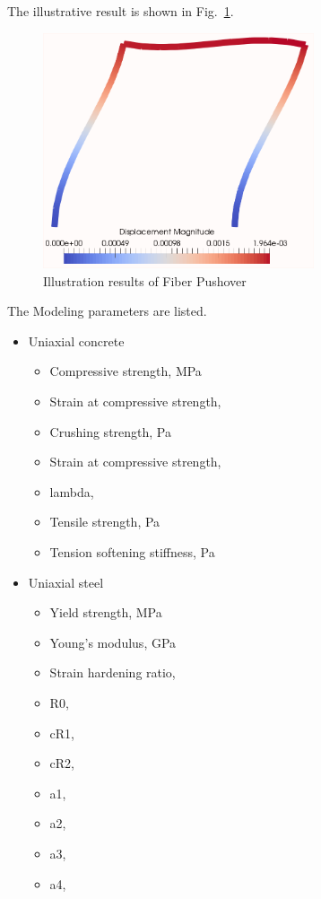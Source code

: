 The illustrative result is shown in Fig.~\ref{fig_day1_fiberbeam_pushover_results}.
\begin{figure}[H]
  \centering
  \includegraphics[width = 8cm]{./Figure-files/Day1/Pushover_for_Nonlinear_Frame/fiberBeamDeform.png}
  \caption{Illustration results of Fiber Pushover}
  \label{fig_day1_fiberbeam_pushover_results}
\end{figure}


The Modeling parameters are listed.
\begin{itemize}
  \item Uniaxial concrete 
  \begin{itemize}
    \item Compressive strength,  \enspace {} MPa
    \item Strain at compressive strength,  \enspace {}
    \item Crushing strength,  \enspace {} Pa
    \item Strain at compressive strength,  \enspace {}
    \item lambda, \enspace {}
    \item Tensile strength, \enspace {} Pa
    \item Tension softening stiffness, \enspace {} Pa
  \end{itemize}
  \item Uniaxial steel
  \begin{itemize}
    \item Yield strength, \enspace {} MPa
    \item Young's modulus, \enspace {} GPa
    \item Strain hardening ratio, \enspace {}
    \item R0, \enspace {}
    \item cR1,  \enspace {}
    \item cR2,  \enspace {}
    \item a1, \enspace {}
    \item a2, \enspace {}
    \item a3, \enspace {}
    \item a4, \enspace {}
  \end{itemize}
\end{itemize}


